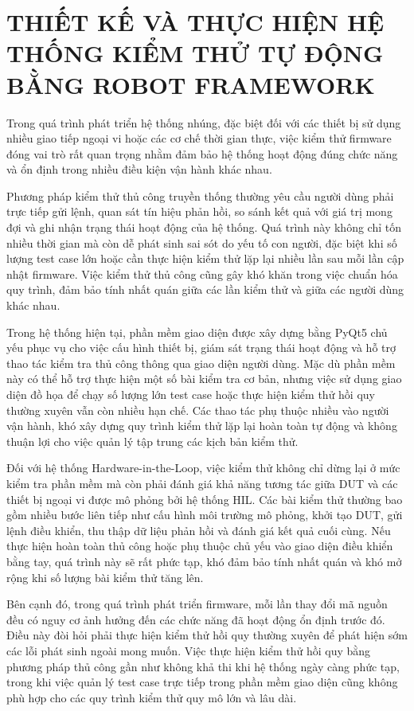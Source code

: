 \chapter{THIẾT KẾ VÀ THỰC HIỆN HỆ THỐNG KIỂM THỬ TỰ ĐỘNG BẰNG ROBOT FRAMEWORK}
Trong quá trình phát triển hệ thống nhúng, đặc biệt đối với các thiết bị sử dụng nhiều giao tiếp ngoại vi hoặc các cơ chế thời gian thực, việc kiểm thử firmware đóng vai trò rất quan trọng nhằm đảm bảo hệ thống hoạt động đúng chức năng và ổn định trong nhiều điều kiện vận hành khác nhau.

Phương pháp kiểm thử thủ công truyền thống thường yêu cầu người dùng phải trực tiếp gửi lệnh, quan sát tín hiệu phản hồi, so sánh kết quả với giá trị mong đợi và ghi nhận trạng thái hoạt động của hệ thống. Quá trình này không chỉ tốn nhiều thời gian mà còn dễ phát sinh sai sót do yếu tố con người, đặc biệt khi số lượng test case lớn hoặc cần thực hiện kiểm thử lặp lại nhiều lần sau mỗi lần cập nhật firmware. Việc kiểm thử thủ công cũng gây khó khăn trong việc chuẩn hóa quy trình, đảm bảo tính nhất quán giữa các lần kiểm thử và giữa các người dùng khác nhau.

Trong hệ thống hiện tại, phần mềm giao diện được xây dựng bằng PyQt5 chủ yếu phục vụ cho việc cấu hình thiết bị, giám sát trạng thái hoạt động và hỗ trợ thao tác kiểm tra thủ công thông qua giao diện người dùng. Mặc dù phần mềm này có thể hỗ trợ thực hiện một số bài kiểm tra cơ bản, nhưng việc sử dụng giao diện đồ họa để chạy số lượng lớn test case hoặc thực hiện kiểm thử hồi quy thường xuyên vẫn còn nhiều hạn chế. Các thao tác phụ thuộc nhiều vào người vận hành, khó xây dựng quy trình kiểm thử lặp lại hoàn toàn tự động và không thuận lợi cho việc quản lý tập trung các kịch bản kiểm thử.

Đối với hệ thống Hardware-in-the-Loop, việc kiểm thử không chỉ dừng lại ở mức kiểm tra phần mềm mà còn phải đánh giá khả năng tương tác giữa DUT và các thiết bị ngoại vi được mô phỏng bởi hệ thống HIL. Các bài kiểm thử thường bao gồm nhiều bước liên tiếp như cấu hình môi trường mô phỏng, khởi tạo DUT, gửi lệnh điều khiển, thu thập dữ liệu phản hồi và đánh giá kết quả cuối cùng. Nếu thực hiện hoàn toàn thủ công hoặc phụ thuộc chủ yếu vào giao diện điều khiển bằng tay, quá trình này sẽ rất phức tạp, khó đảm bảo tính nhất quán và khó mở rộng khi số lượng bài kiểm thử tăng lên.

Bên cạnh đó, trong quá trình phát triển firmware, mỗi lần thay đổi mã nguồn đều có nguy cơ ảnh hưởng đến các chức năng đã hoạt động ổn định trước đó. Điều này đòi hỏi phải thực hiện kiểm thử hồi quy thường xuyên để phát hiện sớm các lỗi phát sinh ngoài mong muốn. Việc thực hiện kiểm thử hồi quy bằng phương pháp thủ công gần như không khả thi khi hệ thống ngày càng phức tạp, trong khi việc quản lý test case trực tiếp trong phần mềm giao diện cũng không phù hợp cho các quy trình kiểm thử quy mô lớn và lâu dài.

